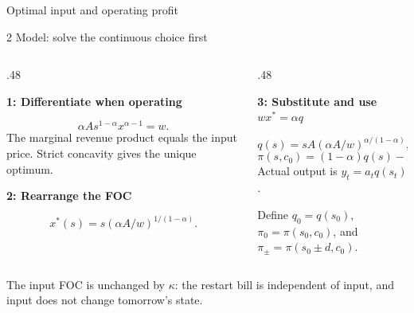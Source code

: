 \documentclass[aspectratio=169,11pt]{beamer}
\newcommand{\kwTurq}[1]{{\color{turquoise}#1}}
\newcommand{\labeltext}[1]{\par{\small\bfseries\color{blue}#1\par}\vspace{1.5mm}}
\newcommand{\takeaway}[1]{\par\vspace{2.5mm}\begingroup\setlength{\fboxsep}{2.5mm}\colorbox{pale}{\begin{minipage}{\dimexpr\linewidth-5mm\relax}\small\raggedright #1\end{minipage}}\endgroup\par}
\newcommand{\sectiontag}[1]{{\scriptsize\color{muted}#1\par}\vspace{2mm}}
\begin{document}
\begin{frame}{Optimal input and \kwTurq{operating profit}}

\sectiontag{2 \textperiodcentered{} Model: solve the continuous choice first}
\begin{columns}[T,onlytextwidth]
\begin{column}{.48\textwidth}
\labeltext{1: Differentiate when operating}
\[\alpha As^{1-\alpha}x^{\alpha-1}=w.\]
\small The marginal revenue product equals the input price. Strict concavity gives the unique optimum.
\vspace{4mm}\labeltext{2: Rearrange the FOC}
\[x^*(s)=s(\alpha A/w)^{1/(1-\alpha)}.\]
\end{column}
\begin{column}{.48\textwidth}
\labeltext{3: Substitute and use $wx^*=\alpha q$}
\[q(s)=sA(\alpha A/w)^{\alpha/(1-\alpha)},\]
\[\boxed{\pi(s,c_0)=(1-\alpha)q(s)-F-c_0.}\]
\small Actual output is $y_t=a_tq(s_t)$.\par\vspace{3mm}
Define $q_0=q(s_0)$, $\pi_0=\pi(s_0,c_0)$, and $\pi_\pm=\pi(s_0\pm d,c_0)$.
\end{column}
\end{columns}
\takeaway{The input FOC is unchanged by $\kappa$: the restart bill is independent of input, and input does not change tomorrow's state.}

\end{frame}
\end{document}
